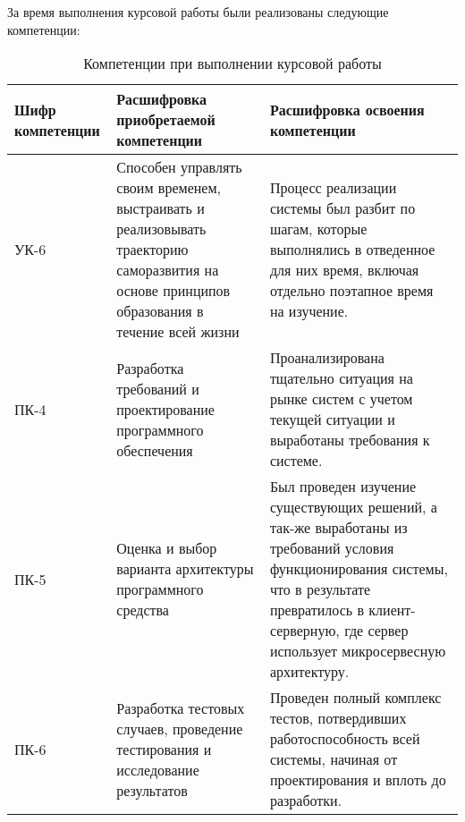 За время выполнения курсовой работы были реализованы следующие компетенции:
\begin{table}[h!]
\centering
\begin{tabular}{|p{3cm}|p{5cm}|p{7cm}|} 
    \hline
    Шифр \newline компетенции & Расшифровка \newline приобретаемой \newline компетенции & Расшифровка освоения \newline компетенции \\[0.5ex] 
        \hline
        УК-6 & Способен управлять своим временем, выстраивать и реализовывать траекторию саморазвития на основе принципов образования в течение всей жизни &  Процесс реализации системы был разбит по шагам, которые выполнялись в отведенное для них время, включая отдельно поэтапное время на изучение.  \\ \hline
        ПК-4 & Разработка требований и проектирование программного обеспечения & Проанализирована тщательно ситуация на рынке систем с учетом текущей ситуации и выработаны требования к системе. \\  \hline
        ПК-5 & Оценка и выбор варианта архитектуры программного средства & Был проведен изучение существующих решений, а так-же выработаны из требований условия функционирования системы, что в результате превратилось в клиент-серверную, где сервер использует микросервесную архитектуру. \\  \hline
        ПК-6 & Разработка тестовых случаев, проведение тестирования и исследование результатов & Проведен полный комплекс тестов, потвердивших работоспособность всей системы, начиная от проектирования и вплоть до разработки.\\ 
 \hline
\end{tabular}
\caption{Компетенции при выполнении курсовой работы}
\label{table:1}
\end{table}

